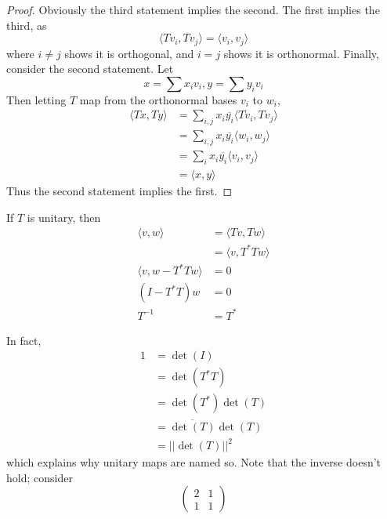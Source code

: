 \documentclass[12pt]{article}
\begin{document}
\begin{proof}
	Obviously the third statement implies the second. The first implies the third, as 
	$$\langle Tv_i,Tv_j \rangle = \langle v_i,v_j \rangle$$
	where $i\neq j$ shows it is orthogonal, and $i=j$ shows it is orthonormal. Finally, consider the second statement. Let
	$$x = \sum x_iv_i, y = \sum y_iv_i$$
	Then letting $T$ map from the orthonormal bases $v_i$ to $w_i$,
	\begin{align*}
		\langle Tx,Ty \rangle &= \sum_{i,j} x_i\overline{y_i} \langle Tv_i,Tv_j \rangle \\
				      &= \sum_{i,j} x_i\overline{y_i} \langle w_i,w_j \rangle \\
				      &= \sum_i x_i\overline{y_i} \langle v_i,v_j \rangle \\
				      &= \langle x,y \rangle
	\end{align*}
	Thus the second statement implies the first.
\end{proof}

If $T$ is unitary, then
\begin{align*}
	\langle v,w \rangle &= \langle Tv,Tw \rangle \\
			    &= \langle v,T^*Tw \rangle \\
	\langle v,w-T^*Tw \rangle &= 0 \\
	(I-T^*T)w &= 0 \\
	T^{-1} &= T^*
\end{align*}

In fact,
\begin{align*}
	1 &= \det(I) \\
	  &= \det(T^*T) \\
	  &= \det(T^*)\det(T) \\
	  &= \overline{\det(T)}\det(T) \\
	  &= ||\det(T)||^2
\end{align*}
which explains why unitary maps are named so. Note that the inverse doesn't hold; consider
$$\begin{pmatrix} 2 & 1 \\ 1 & 1 \end{pmatrix}$$
\end{document}
